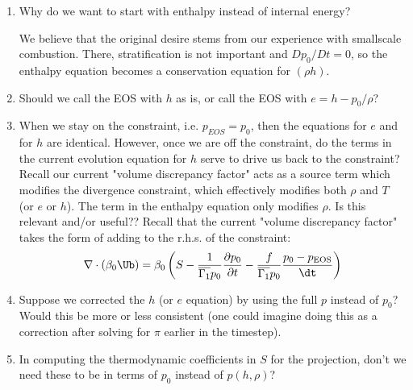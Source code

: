 \begin{enumerate}
\item Why do we want to start with enthalpy instead of internal energy?

   We believe that the original desire stems from our experience with
   smallscale combustion.  There, stratification is not important and
   $Dp_0/Dt = 0$, so the enthalpy equation becomes a conservation
   equation for $(\rho h)$.

\item Should we call the EOS with $h$ as is, or call the EOS with $e =
  h - p_0 / \rho$?

\item When we stay on the constraint, i.e. $p_{EOS} = p_0$, then the
  equations for $e$ and for $h$ are identical.  However, once we are
  off the constraint, do the terms in the current evolution equation
  for $h$ serve to drive us back to the constraint?  Recall our
  current "volume discrepancy factor" acts as a source term which
  modifies the divergence constraint, which effectively modifies both
  $\rho$ and $T$ (or $e$ or $h$).  The term in the enthalpy equation
  only modifies $\rho.$ Is this relevant and/or useful??  Recall that
  the current "volume discrepancy factor" takes the form of adding to
  the r.h.s. of the constraint:
\begin{equation}
\nabla \cdot(\beta_0\Ub) = \beta_0\left(S-\frac{1}{\overline{\Gamma_1} p_0}
       \frac{\partial p_0}{\partial t} - \frac{f}{\overline{\Gamma_1} p_0}
       \frac{p_0-p_\text{EOS}}{\dt}\right) 
\end{equation}


\item Suppose we corrected the $h$ (or $e$ equation) by using the full
  $p$ instead of $p_0$?  Would this be more or less consistent (one
  could imagine doing this as a correction after solving for $\pi$
  earlier in the timestep).

%
%
%

\item In computing the thermodynamic coefficients in $S$ for the
  projection, don't we need these to be in terms of $p_0$ instead of
  $p(h,\rho)$?

\end{enumerate}

